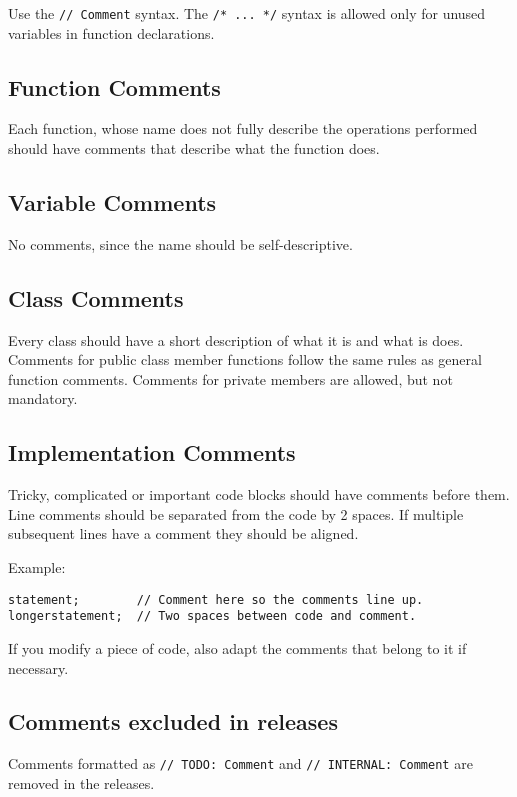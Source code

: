 \documentclass[a4paper]{article}
\newcommand{\inlinecode}[1]{\lstinline|#1|}
\begin{document}
Use the \inlinecode{// Comment} syntax. The \inlinecode{/* ... */} syntax is allowed only for unused variables in function declarations.

\subsection{Function Comments}

Each function, whose name does not fully describe the operations performed should have comments that describe what the function does.

\subsection{Variable Comments}

No comments, since the name should be self-descriptive.

\subsection{Class Comments}

Every class should have a short description of what it is and what is does.
Comments for public class member functions follow the same rules as general function comments.
Comments for private members are allowed, but not mandatory.

\subsection{Implementation Comments}

Tricky, complicated or important code blocks should have comments before them.
Line comments should be separated from the code by 2 spaces. If multiple subsequent lines have a comment they should be aligned.

Example:
\begin{lstlisting}
statement;        // Comment here so the comments line up.
longerstatement;  // Two spaces between code and comment.
\end{lstlisting}

If you modify a piece of code, also adapt the comments that belong to it if necessary.

\subsection{Comments excluded in releases}

Comments formatted as \inlinecode{// TODO: Comment} and \inlinecode{// INTERNAL: Comment} are removed in the releases.
\end{document}
